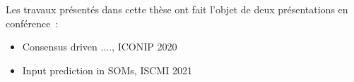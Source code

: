 Les travaux présentés dans cette thèse ont fait l'objet de deux présentations en conférence~:
\begin{itemize}
    \item Consensus driven ...., ICONIP 2020
    \item Input prediction in SOMs, ISCMI 2021
\end{itemize}











